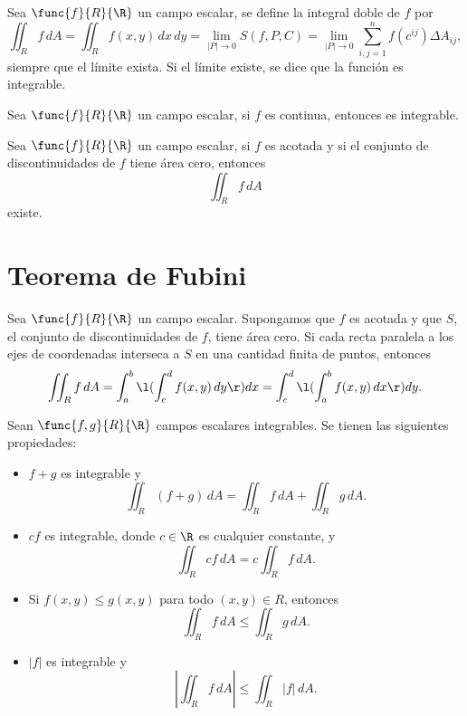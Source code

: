 \documentclass[a4,11pt]{aleph-notas}
\begin{document}
\begin{defi}
    Sea $\func{f}{R}{\R}$ un campo escalar, se define la integral doble de $f$ por
    \[
        \iint_R f\, dA =\iint_R f(x,y)\,dx\,dy
        = \lim_{|P|\to 0} S(f,P,C)
        = \lim_{|P|\to 0} \sum_{i,j=1}^n f(c^{ij})\Delta A_{ij},
    \]
    siempre que el límite exista. Si el límite existe, se dice que la función es integrable.
\end{defi}

\begin{prop}
    Sea $\func{f}{R}{\R}$ un campo escalar, si $f$ es continua, entonces es integrable.
\end{prop}

\begin{prop}
    Sea $\func{f}{R}{\R}$ un campo escalar, si $f$ es acotada y si el conjunto de discontinuidades de $f$ tiene área cero, entonces
    \[
        \iint_R f\, dA
    \]
    existe.
\end{prop}

\section{Teorema de Fubini}

\begin{teo}
    Sea $\func{f}{R}{\R}$ un campo escalar. Supongamos que $f$ es acotada y que $S$, el conjunto de discontinuidades de $f$, tiene área cero. Si cada recta paralela a los ejes de coordenadas interseca a $S$ en una cantidad finita de puntos, entonces
    \[
        \iint_R f\, dA = \int_a^b\l( \int_c^d f(x,y)\, dy\r)dx = \int_c^d\l( \int_a^b f(x,y)\, dx\r)dy.
    \]
\end{teo}

\begin{prop}
    Sean $\func{f,g}{R}{\R}$ campos escalares integrables. Se tienen las siguientes propiedades:
    \begin{itemize}
        \item $f+g$ es integrable y
        \[
            \iint_R (f+g)\, dA = \iint_R f\, dA + \iint_R g\, dA.
        \]
        \item $cf$ es integrable, donde $c\in\R$ es cualquier constante, y
        \[
            \iint_R cf\, dA = c \iint_R f\, dA.
        \]
        \item Si $f(x,y)\leq g(x,y)$ para todo $(x,y)\in R$, entonces
        \[
            \iint_R f\, dA \leq \iint_R g\, dA.
        \]
        \item $|f|$ es integrable y
        \[
            \left| \iint_R f\, dA \right| \leq \iint_R |f|\, dA.
        \]
    \end{itemize}
\end{prop}
\end{document}
